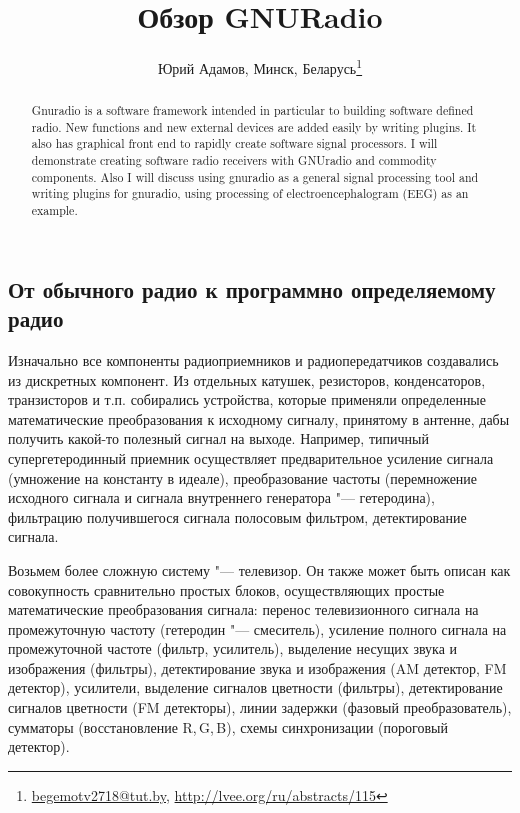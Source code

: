 \documentclass[10pt, a5paper]{article}
\begin{document}
\title{Обзор GNURadio}
\author{Юрий Адамов, Минск, Беларусь\footnote{\url{begemotv2718@tut.by}, \url{http://lvee.org/ru/abstracts/115}}}
\maketitle
\begin{abstract}
Gnuradio is a software framework intended in particular to building software defined radio. New functions and new external devices are added easily by writing plugins. It also has graphical front end to rapidly create software signal processors.
I will demonstrate creating software radio receivers with GNUradio and commodity components.
Also I will discuss using gnuradio as a general signal processing tool and writing plugins for gnuradio, using processing of electroencephalogram (EEG) as an example.
\end{abstract}
\subsection*{От обычного радио к программно определяемому радио}

Изначально все компоненты радиоприемников и радиопередатчиков создавались из дискретных компонент. Из отдельных катушек, резисторов,  конденсаторов, транзисторов и т.п. собирались устройства, которые применяли определенные математические преобразования к исходному сигналу, принятому в антенне, дабы получить какой-то полезный сигнал на выходе. Например, типичный супергетеродинный приемник осуществляет предварительное усиление сигнала (умножение на константу в идеале), преобразование частоты (перемножение исходного сигнала и сигнала внутреннего генератора "--- гетеродина), фильтрацию получившегося сигнала полосовым фильтром, детектирование сигнала.

Возьмем более сложную систему "--- телевизор. Он также может быть описан как совокупность сравнительно простых блоков, осуществляющих простые математические преобразования сигнала: перенос телевизионного сигнала на промежуточную частоту (гетеродин "--- смеситель), усиление полного сигнала на промежуточной частоте (фильтр, усилитель), выделение несущих звука и изображения (фильтры), детектирование звука и изображения (AM детектор, FM детектор), усилители, выделение сигналов цветности (фильтры), детектирование сигналов цветности (FM детекторы), линии задержки (фазовый преобразователь), сумматоры (восстановление R,\,G,\,B), схемы синхронизации (пороговый детектор).
\end{document}
